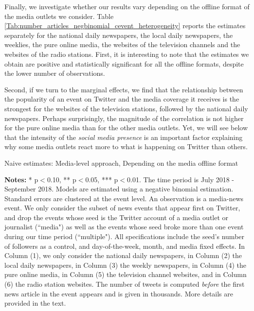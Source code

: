 Finally, we investigate whether our results vary depending on the offline format of the media outlets we consider. Table \ref{Tab:number_articles_negbinomial_cevent_heterogeneity} reports the estimates separately for the national daily newspapers, the local daily newspapers, the weeklies, the pure online media, the websites of the television channels and the websites of the radio stations. First, it is interesting to note that the estimates we obtain are positive and statistically significant for all the offline formats, despite the lower number of observations.

Second, if we turn to the marginal effects, we find that the relationship between the popularity of an event on Twitter and the media coverage it receives is the strongest for the websites of the television stations, followed by the national daily newspapers. Perhaps surprisingly, the magnitude of the correlation is not higher for the pure online media than for the other media outlets. Yet, we will see below that the intensity of the \textit{social media presence} is an important factor explaining why some media outlets react more to what is happening on Twitter than others.


\begin{table}
\caption{Naive estimates: Media-level approach, Depending on the media offline format}
\begin{center}
	
\end{center}
\begin{spacing}{0.5}
	{\fns \textbf{Notes:} * p$<$0.10, ** p$<$0.05, *** p$<$0.01. The time period is July 2018 - September 2018.  Models are estimated using a negative binomial estimation. Standard errors are clustered at the event level. An observation is a media-news event. We only consider the subset of news events that appear first on Twitter, and drop the events whose seed is the Twitter account of a media outlet or journalist (``media") as well as the events whose seed broke more than one event during our time period (``multiple"). All specifications include the seed's number of followers as a control, and day-of-the-week, month, and media fixed effects. In Column (1), we only consider the national daily newspapers, in Column (2) the local daily newspapers, in Column (3) the weekly newspapers, in Column (4) the pure online media, in Column (5) the television channel websites, and in Column (6) the radio station websites. The number of tweets is computed \textit{before} the first news article in the event appears and is given in thousands. More details are provided in the text.} 
\end{spacing}
\label{Tab:number_articles_negbinomial_cevent_heterogeneity}
\end{table} 



